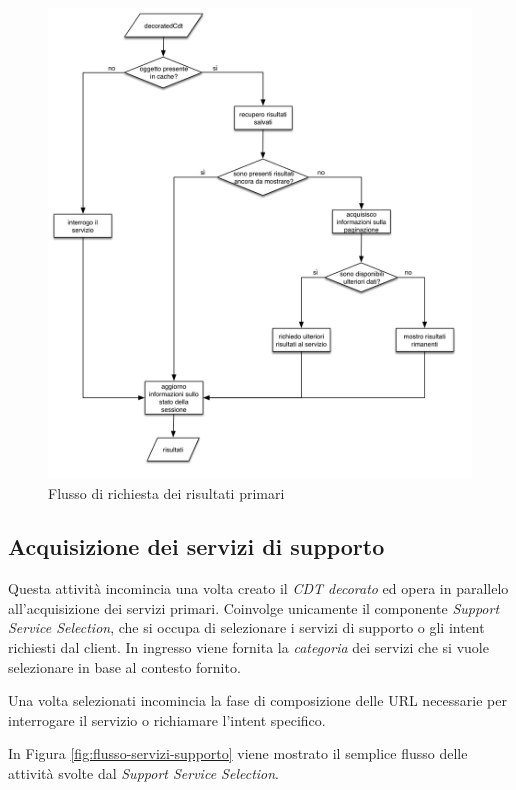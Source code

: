 \begin{figure}[ht]
	\centering
	\includegraphics[width=\textwidth]{5-implementazione-backend/Immagini/diagramma_flusso_servizi_primari.png}
	\caption{Flusso di richiesta dei risultati primari\label{fig:flusso-servizi-primari}}
\end{figure}

\subsection*{Acquisizione dei servizi di supporto}

Questa attività incomincia una volta creato il \emph{CDT decorato} ed opera in parallelo all'acquisizione dei servizi primari. Coinvolge unicamente il componente \emph{Support Service Selection}, che si occupa di selezionare i servizi di supporto o gli intent richiesti dal client. In ingresso viene fornita la \emph{categoria} dei servizi che si vuole selezionare in base al contesto fornito.

Una volta selezionati incomincia la fase di composizione delle URL necessarie per interrogare il servizio o richiamare l'intent specifico.

In Figura \ref{fig:flusso-servizi-supporto} viene mostrato il semplice flusso delle attività svolte dal \emph{Support Service Selection}.
	
